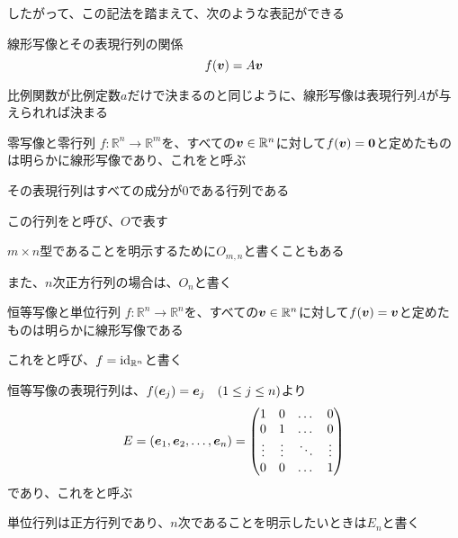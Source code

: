 \documentclass[b5paper,12pt]{jsarticle}
\begin{document}
したがって、この記法を踏まえて、次のような表記ができる

\begin{theorem}{線形写像とその表現行列の関係}
  \begin{equation*}
    f(\vb*{v}) = A\vb*{v}
  \end{equation*}
\end{theorem}

比例関数が比例定数$a$だけで決まるのと同じように、線形写像は表現行列$A$が与えられれば決まる

\sectionline

\begin{definition}{零写像と零行列}
  $f\colon \mathbb{R}^n \to \mathbb{R}^m$を、すべての$\vb*{v} \in \mathbb{R}^n$に対して$f(\vb*{v}) = \vb*{0}$と定めたものは明らかに線形写像であり、これをと呼ぶ

  その表現行列はすべての成分が0である行列である

  この行列をと呼び、$O$で表す
\end{definition}

$m \times n$型であることを明示するために$O_{m,n}$と書くこともある

また、$n$次正方行列の場合は、$O_n$と書く

\sectionline

\begin{definition}{恒等写像と単位行列}
  $f\colon \mathbb{R}^n \to \mathbb{R}^n$を、すべての$\vb*{v} \in \mathbb{R}^n$に対して$f(\vb*{v}) = \vb*{v}$と定めたものは明らかに線形写像である

  これをと呼び、$f = \operatorname{id}_{\mathbb{R}^n}$と書く

  恒等写像の表現行列は、$f(\vb*{e}_j) = \vb*{e}_j \quad (1 \leq j \leq n)$より
  \begin{equation*}
    E = (\vb*{e}_1, \vb*{e}_2, \dots, \vb*{e}_n) = \begin{pmatrix}
      1      & 0      & \dots  & 0      \\
      0      & 1      & \dots  & 0      \\
      \vdots & \vdots & \ddots & \vdots \\
      0      & 0      & \dots  & 1
    \end{pmatrix}
  \end{equation*}
  であり、これをと呼ぶ
\end{definition}

単位行列は正方行列であり、$n$次であることを明示したいときは$E_n$と書く
\end{document}
